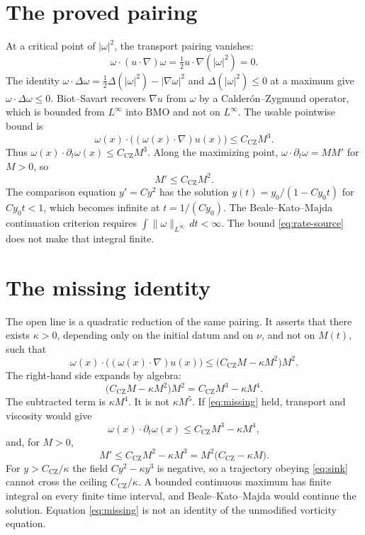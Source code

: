 \documentclass[11pt]{article}
\theoremstyle{definition}
\theoremstyle{remark}
\begin{document}
\section{The proved pairing}
At a critical point of $|\omega|^2$, the transport pairing vanishes:
\[
\omega\cdot(u\cdot\nabla)\omega=\tfrac12 u\cdot\nabla(|\omega|^2)=0.
\]
The identity $\omega\cdot\Delta\omega=\tfrac12\Delta(|\omega|^2)-|\nabla\omega|^2$ and $\Delta(|\omega|^2)\le 0$ at a maximum give $\omega\cdot\Delta\omega\le 0$. Biot--Savart recovers $\nabla u$ from $\omega$ by a Calder\'on--Zygmund operator, which is bounded from $L^\infty$ into $\mathrm{BMO}$ and not on $L^\infty$. The usable pointwise bound is
\begin{equation}
\label{eq:source}
\omega(x)\cdot\bigl((\omega(x)\cdot\nabla)u(x)\bigr)\le C_{\mathrm{CZ}} M^3.
\end{equation}
Thus $\omega(x)\cdot\partial_t\omega(x)\le C_{\mathrm{CZ}} M^3$. Along the maximizing point, $\omega\cdot\partial_t\omega=M M'$ for $M>0$, so
\begin{equation}
\label{eq:rate-source}
M'\le C_{\mathrm{CZ}} M^2.
\end{equation}
The comparison equation $y'=C y^2$ has the solution $y(t)=y_0/(1-C y_0 t)$ for $C y_0 t<1$, which becomes infinite at $t=1/(C y_0)$. The Beale--Kato--Majda continuation criterion requires $\int\|\omega\|_{L^\infty}\,dt<\infty$. The bound \eqref{eq:rate-source} does not make that integral finite.

\section{The missing identity}
The open line is a quadratic reduction of the same pairing. It asserts that there exists $\kappa>0$, depending only on the initial datum and on $\nu$, and not on $M(t)$, such that
\begin{equation}
\label{eq:missing}
\omega(x)\cdot\bigl((\omega(x)\cdot\nabla)u(x)\bigr)
\le\bigl(C_{\mathrm{CZ}} M-\kappa M^2\bigr)M^2.
\end{equation}
The right-hand side expands by algebra:
\begin{equation}
\label{eq:expand}
\bigl(C_{\mathrm{CZ}} M-\kappa M^2\bigr)M^2=C_{\mathrm{CZ}} M^3-\kappa M^4.
\end{equation}
The subtracted term is $\kappa M^4$. It is not $\kappa M^5$. If \eqref{eq:missing} held, transport and viscosity would give
\[
\omega(x)\cdot\partial_t\omega(x)\le C_{\mathrm{CZ}} M^3-\kappa M^4,
\]
and, for $M>0$,
\begin{equation}
\label{eq:sink}
M'\le C_{\mathrm{CZ}} M^2-\kappa M^3=M^2\bigl(C_{\mathrm{CZ}}-\kappa M\bigr).
\end{equation}
For $y>C_{\mathrm{CZ}}/\kappa$ the field $C y^2-\kappa y^3$ is negative, so a trajectory obeying \eqref{eq:sink} cannot cross the ceiling $C_{\mathrm{CZ}}/\kappa$. A bounded continuous maximum has finite integral on every finite time interval, and Beale--Kato--Majda would continue the solution. Equation \eqref{eq:missing} is not an identity of the unmodified vorticity equation.
\end{document}
